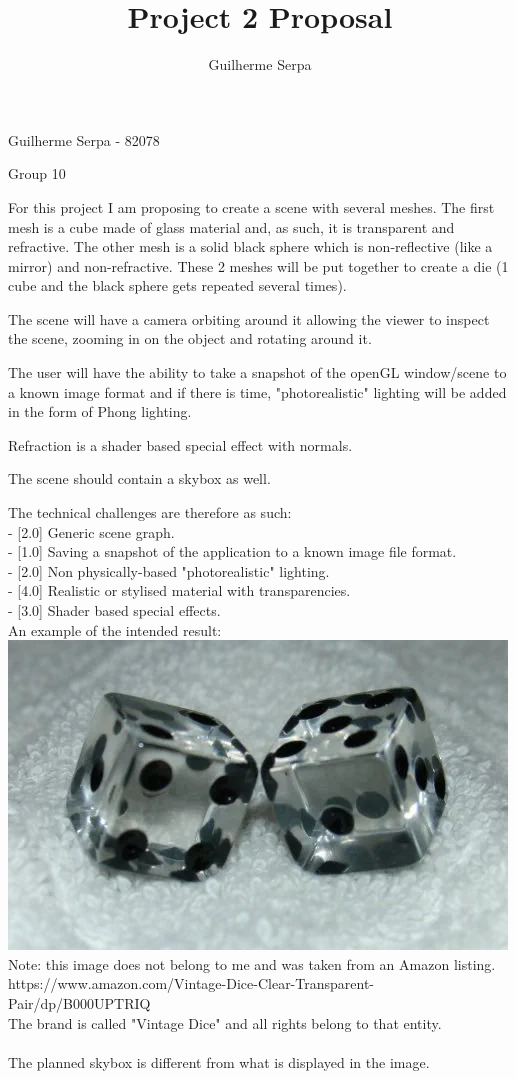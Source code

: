 \documentclass{article}
\title{Project 2 Proposal}
\author{Guilherme Serpa}
\begin{document}
\maketitle
\centerline{Guilherme Serpa - 82078}
\centerline{Group 10}

\newpage{}
For this project I am proposing to create a scene with several meshes. The first mesh is a
cube made of glass material and, as such, it is transparent and refractive. The other mesh is
a solid black sphere which is non-reflective (like a mirror) and non-refractive.
These 2 meshes will be put together to create a die (1 cube and the black sphere gets repeated
several times).

The scene will have a camera orbiting around it allowing the viewer to inspect the scene, zooming
in on the object and rotating around it.

The user will have the ability to take a snapshot of the openGL window/scene to a known image format
and if there is time, "photorealistic" lighting will be added in the form of Phong lighting.

Refraction is a shader based special effect with normals.

The scene should contain a skybox as well.

The technical challenges are therefore as such: \\
- [2.0] Generic scene graph. \\
- [1.0] Saving a snapshot of the application to a known image file format. \\
- [2.0] Non physically-based "photorealistic" lighting. \\
- [4.0] Realistic or stylised material with transparencies. \\
- [3.0] Shader based special effects. \\

An example of the intended result:\\
\includegraphics[scale=0.5]{dice.jpg} \\

Note: this image does not belong to me and was taken from an Amazon listing. \\
https://www.amazon.com/Vintage-Dice-Clear-Transparent-Pair/dp/B000UPTRIQ \\
The brand is called "Vintage Dice" and all rights belong to that entity. \\\\

The planned skybox is different from what is displayed in the image.
\end{document}

